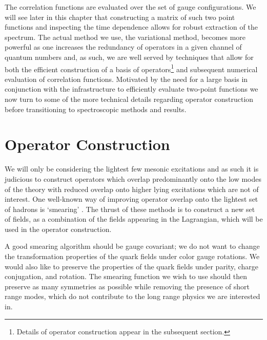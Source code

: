 The correlation functions are evaluated over the set of gauge configurations. We will see later in this chapter that constructing a matrix of such two point functions and inspecting the time dependence allows for robust extraction of the spectrum. The actual method we use, the variational method, becomes more powerful as one increases the redundancy of operators in a given channel of quantum numbers and, as such, we are well served by techniques that allow for both the efficient construction of a basis of operators\footnote{Details of operator construction appear in the subsequent section.} and subsequent numerical evaluation of correlation functions. Motivated by the need for a large basis in conjunction with the infrastructure to efficiently evaluate two-point functions we now turn to some of the more technical details regarding operator construction before transitioning to spectroscopic methods and results.


\section{Operator Construction} \label{sec::Spec:ops}
We will only be considering the lightest few mesonic excitations and as such it is judicious to construct operators which overlap predominantly onto the low modes of the theory with reduced overlap onto higher lying excitations which are not of interest. One well-known way of improving operator overlap onto the lightest set of hadrons is `smearing' \cite{Allton:1993wc}. The thrust of these methods is to construct a new set of fields, as a combination of the fields appearing in the Lagrangian, which will be used in the operator construction. 


A good smearing algorithm should be gauge covariant; we do not want to change the transformation properties of the quark fields under color gauge rotations. We would also like to preserve the properties of the quark fields under parity, charge conjugation, and rotation. The smearing function we wish to use should then preserve as many symmetries as possible while removing the presence of short range modes, which do not contribute to the long range physics we are interested in. 

